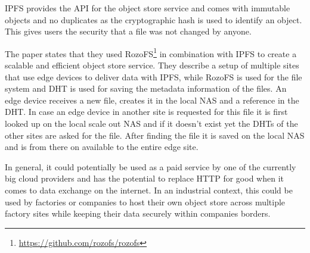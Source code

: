 IPFS provides the API for the object store service and comes with immutable objects and no duplicates as the cryptographic hash is used \cite{8014358} to identify an object. This gives users the security that a file was not changed by anyone.

The paper states that they used RozoFS\footnote{\url{https://github.com/rozofs/rozofs}} in combination with IPFS to create a scalable and efficient object store service. They describe a setup of multiple sites that use edge devices to deliver data with IPFS, while RozoFS is used for the file system and DHT is used for saving the metadata information of the files. An edge device receives a new file, creates it in the local NAS and a reference in the DHT. In case an edge device in another site is requested for this file it is first looked up on the local scale out NAS and if it doesn’t exist yet the DHTs of the other sites are asked for the file. After finding the file it is saved on the local NAS and is from there on available to the entire edge site.

In general, it could potentially be used as a paid service by one of the currently big cloud providers and has the potential to replace HTTP for good when it comes to data exchange on the internet. In an industrial context, this could be used by factories or companies to host their own object store across multiple factory sites while keeping their data securely within companies borders.
